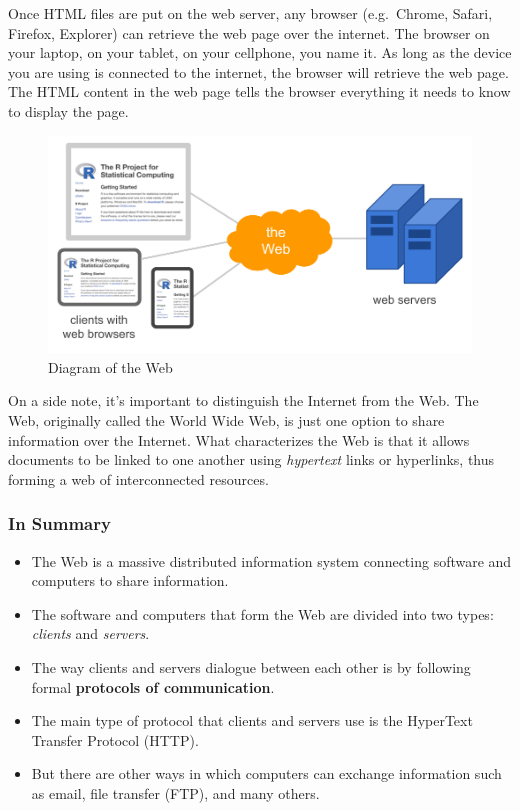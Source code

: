 \documentclass[
]{book}
\begin{document}
Once HTML files are put on the web server, any browser (e.g.~Chrome, Safari,
Firefox, Explorer) can retrieve the web page over the internet. The browser
on your laptop, on your tablet, on your cellphone, you name it. As long as the
device you are using is connected to the internet, the browser will retrieve
the web page. The HTML content in the web page tells the browser everything it
needs to know to display the page.

\begin{figure}

{\centering \includegraphics[width=0.75\linewidth]{images/http/web-scheme4} 

}

\caption{Diagram of the Web}\label{fig:unnamed-chunk-8}
\end{figure}

On a side note, it's important to distinguish the Internet from the Web. The
Web, originally called the World Wide Web, is just one option to share
information over the Internet. What characterizes the Web is that it allows
documents to be linked to one another using \emph{hypertext} links or hyperlinks,
thus forming a web of interconnected resources.

\hypertarget{in-summary}{%
\subsubsection*{In Summary}\label{in-summary}}

\begin{itemize}
\item
  The Web is a massive distributed information system connecting software
  and computers to share information.
\item
  The software and computers that form the Web are divided into two types:
  \emph{clients} and \emph{servers}.
\item
  The way clients and servers dialogue between each other is by following
  formal \textbf{protocols of communication}.
\item
  The main type of protocol that clients and servers use is the HyperText
  Transfer Protocol (HTTP).
\item
  But there are other ways in which computers can exchange information such as
  email, file transfer (FTP), and many others.
\end{itemize}
\end{document}
